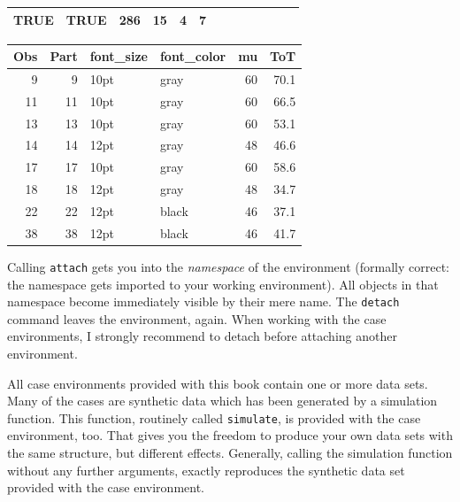 \documentclass[]{svmono}
\newenvironment{Shaded}{\begin{snugshade}}{\end{snugshade}}
\newcommand{\KeywordTok}[1]{\textcolor[rgb]{0.13,0.29,0.53}{\textbf{#1}}}
\newcommand{\DecValTok}[1]{\textcolor[rgb]{0.00,0.00,0.81}{#1}}
\newcommand{\StringTok}[1]{\textcolor[rgb]{0.31,0.60,0.02}{#1}}
\newcommand{\OperatorTok}[1]{\textcolor[rgb]{0.81,0.36,0.00}{\textbf{#1}}}
\newcommand{\NormalTok}[1]{#1}
\theoremstyle{definition}
\theoremstyle{definition}
\theoremstyle{definition}
\theoremstyle{remark}
\begin{document}
\begin{longtable}[]{@{}rrllllrllrrrr@{}}
\begin{minipage}[t]{0.08\columnwidth}
TRUE\strut
\end{minipage} & \begin{minipage}[t]{0.08\columnwidth}\raggedright\strut
TRUE\strut
\end{minipage} & \begin{minipage}[t]{0.03\columnwidth}\raggedleft\strut
286\strut
\end{minipage} & \begin{minipage}[t]{0.05\columnwidth}\raggedleft\strut
15\strut
\end{minipage} & \begin{minipage}[t]{0.06\columnwidth}\raggedleft\strut
4\strut
\end{minipage} & \begin{minipage}[t]{0.05\columnwidth}\raggedleft\strut
7\strut
\end{minipage}\tabularnewline
\bottomrule
\end{longtable}

\begin{Shaded}
\end{Shaded}

\begin{longtable}[]{@{}rrllrr@{}}
\toprule
Obs & Part & font\_size & font\_color & mu & ToT\tabularnewline
\midrule
\endhead
9 & 9 & 10pt & gray & 60 & 70.1\tabularnewline
11 & 11 & 10pt & gray & 60 & 66.5\tabularnewline
13 & 13 & 10pt & gray & 60 & 53.1\tabularnewline
14 & 14 & 12pt & gray & 48 & 46.6\tabularnewline
17 & 17 & 10pt & gray & 60 & 58.6\tabularnewline
18 & 18 & 12pt & gray & 48 & 34.7\tabularnewline
22 & 22 & 12pt & black & 46 & 37.1\tabularnewline
38 & 38 & 12pt & black & 46 & 41.7\tabularnewline
\bottomrule
\end{longtable}

Calling \texttt{attach} gets you into the \emph{namespace} of the
environment (formally correct: the namespace gets imported to your
working environment). All objects in that namespace become immediately
visible by their mere name. The \texttt{detach} command leaves the
environment, again. When working with the case environments, I strongly
recommend to detach before attaching another environment.

All case environments provided with this book contain one or more data
sets. Many of the cases are synthetic data which has been generated by a
simulation function. This function, routinely called \texttt{simulate},
is provided with the case environment, too. That gives you the freedom
to produce your own data sets with the same structure, but different
effects. Generally, calling the simulation function without any further
arguments, exactly reproduces the synthetic data set provided with the
case environment.
\end{document}
